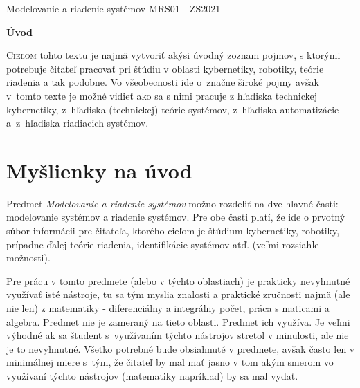\documentclass[a4paper, 10pt, ]{article}
\def\oznacenieCasti{MRS01 - ZS2021}
\begin{document}
\lstset{%
style=mystyle,
rangebeginprefix=\#\#\#\ cellB\ ,%
rangebeginsuffix=\ \#\#\#,%
rangeendprefix=\#\#\#\ cellE\ ,%
rangeendsuffix=\ \#\#\#,%
includerangemarker=false,
}




\fontsize{12pt}{22pt}\selectfont

\centerline{\textsf{Modelovanie a riadenie systémov} \hfill \textsf{\oznacenieCasti}}

\fontsize{18pt}{22pt}\selectfont





\begin{flushleft}
	\textbf{\textsf{Úvod}}
\end{flushleft}





\normalsize

\bigskip

{\hypersetup{hidelinks}

\tableofcontents

}

\bigskip

\vspace{18pt}



\noindent
\lettrine[lines=3, nindent=0pt]{C}{ieľom} tohto textu je najmä vytvoriť akýsi úvodný zoznam pojmov, s ktorými potrebuje čitateľ pracovať pri štúdiu v oblasti kybernetiky, robotiky, teórie riadenia a tak podobne. Vo všeobecnosti ide o~značne široké pojmy avšak v~tomto texte je možné vidieť ako sa s nimi pracuje z hľadiska technickej kybernetiky, z~hľadiska (technickej) teórie systémov, z~hľadiska automatizácie a~z~hľadiska riadiacich systémov.






\section{Myšlienky na úvod}

Predmet \emph{Modelovanie a riadenie systémov} možno rozdeliť na dve hlavné časti: modelovanie systémov a riadenie systémov. Pre obe časti platí, že ide o prvotný súbor informácii pre čitateľa, ktorého cieľom je štúdium kybernetiky, robotiky, prípadne ďalej teórie riadenia, identifikácie systémov atď. (veľmi rozsiahle možnosti).

Pre prácu v tomto predmete (alebo v týchto oblastiach) je prakticky nevyhnutné využívať isté nástroje, tu sa tým myslia znalosti a praktické zručnosti najmä (ale nie len) z matematiky - diferenciálny a integrálny počet, práca s maticami a algebra. Predmet nie je zameraný na tieto oblasti. Predmet ich využíva. Je veľmi výhodné ak sa študent s~využívaním týchto nástrojov stretol v minulosti, ale nie je to nevyhnutné. Všetko potrebné bude obsiahnuté v predmete, avšak často len v minimálnej miere s~tým, že čitateľ by mal mať jasno v tom akým smerom vo využívaní týchto nástrojov (matematiky napríklad) by sa mal vydať.
\end{document}
